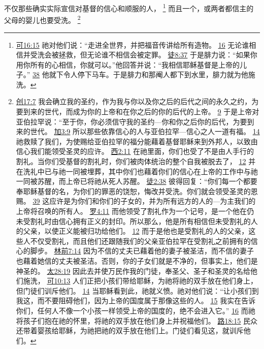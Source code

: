 \documentclass[12pt, a4paper, oneside]{ctexart}
\newcounter{parnum}[section]
\newcommand{\N}{%
   \noindent\refstepcounter{parnum}%
    \makebox[\parindent][l]{\textbf{\arabic{parnum}.}}}
\begin{document}
\N 不仅那些确实实际宣信对基督的信心和顺服的人，
	\footnote {
		\href{https://biblehub.com/mark/16-15.htm}{可16:15} 祂对他们说：“走进全世界，并把福音传讲给所有造物。
		\href{https://biblehub.com/mark/16-16.htm}{16} 无论谁相信并受洗会被拯救，但无论谁不相信会被定罪。
		\href{https://biblehub.com/acts/8-37.htm}{徒8:37} 于是腓力说：“如果你用你所有的心相信，你就可以。”他回答并说：“我相信耶稣基督是上帝的儿子。”
		\href{https://biblehub.com/acts/8-38.htm}{38} 他就下令人停下马车。于是腓力和那阉人都下到水里，腓力就为他施洗。
	}
	而且一个，或两者都信主的父母的婴儿也要受洗。
	\footnote {
		\href{https://biblehub.com/genesis/17-7.htm}{创17:7} 我会确立我的圣约，作为我与你以及你之后的后代之间的永久之约，为要到来的世代，而成为你的上帝和在你之后的你的后代的上帝。
		\href{https://biblehub.com/genesis/17-9.htm}{9} 于是上帝对亚伯拉罕说：“至于你，你必须信守我的圣约---你和你之后你的后代，为要到来的世代。
		\href{https://biblehub.com/galatians/3-9.htm}{加3:9} 所以那些依靠信心的人与亚伯拉罕---信心之人一道有福。
		\href{https://biblehub.com/galatians/3-14.htm}{14} 祂救赎了我们，为使赐给亚伯拉罕的福分能藉着基督耶稣来到外邦人，以致由信心我们能领受圣灵的应许。
		\href{https://biblehub.com/colossians/2-11.htm}{西2:11} 在祂里面，你们也受了不是由人手行的割礼。当你们受基督的割礼时，你们被肉体统治的整个自我被脱去了，
		\href{https://biblehub.com/colossians/2-12.htm}{12} 并在洗礼中已与祂一同被埋葬，其中你们也藉着你们的信心在上帝的工作中与祂一同被苏醒，而上帝已将祂从死人苏醒。
		\href{https://biblehub.com/acts/2-38.htm}{徒2:38} 彼得回复：“你们每一个都要奉耶稣基督的名，为你们的罪恶的饶恕，悔改并受洗。你们就会领受圣灵的恩赐。
		\href{https://biblehub.com/acts/2-39.htm}{39} 这应许是为你们和你们的子女的，并为所有远方的人的---为主我们的上帝将召唤的所有人。
		\href{https://biblehub.com/romans/4-11.htm}{罗4:11} 而他领受了割礼作为一个记号，是一个他在仍未受割礼时由信心拥有正义的封印。所以那么，他是所有相信但未受割礼的人的父亲，以使正义能被归功给他们。
		\href{https://biblehub.com/romans/4-12.htm}{12} 而于是他也是受割礼的人的父亲，这些人不仅受割礼，而且他们还跟随我们的父亲亚伯拉罕在受割礼之前拥有的信心的脚步。
		\href{https://biblehub.com/1_corinthians/7-14.htm}{林前7:14} 因为不信的丈夫已藉着他的妻子被圣洁，而不信的妻子也藉着她信的丈夫被圣洁。否则，你的子女们就是不净的，但事实上，他们是神圣的。
		\href{https://biblehub.com/matthew/28-19.htm}{太28:19} 因此去并使万民作我的门徒，奉圣父、圣子和圣灵的名给他们施洗，
		\href{https://biblehub.com/mark/10-13.htm}{可10:13} 人们正把小孩们带给耶稣，为祂将祂的双手放在他们身上，但门徒们训斥他们。
		\href{https://biblehub.com/mark/10-14.htm}{14} 当耶稣看到此，祂就义愤。祂对他们说：“让小孩们到我这，而不要阻碍他们，因为上帝的国度属于那像这些的人。
		\href{https://biblehub.com/mark/10-15.htm}{15} 我实在告诉你们，任何人不像一个小孩一样领受上帝的国度的，绝不会进入它。”
		\href{https://biblehub.com/mark/10-16.htm}{16} 而祂将孩子们抱在祂的怀里，将祂的双手放在他们身上并祝福他们。
		\href{https://biblehub.com/luke/18-15.htm}{路18:15} 民众还带着婴孩给耶稣，为祂把祂的双手放在他们上。门徒们看见这，就训斥他们。
	}
\end{document}
